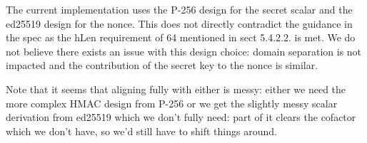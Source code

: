 The current implementation uses the P-256 design for the secret scalar and the ed25519 design for the nonce. This does not directly contradict the guidance in the spec as the hLen requirement of 64 mentioned in sect 5.4.2.2. is met. We do not believe there exists an issue with this design choice: domain separation is not impacted and the contribution of the secret key to the nonce is similar. 

Note that it seems that aligning fully with either is messy: either we need the more complex HMAC design from P-256 or we get the slightly messy scalar derivation from ed25519 which we don’t fully need: part of it clears the cofactor which we don’t have, so we’d still have to shift things around.

